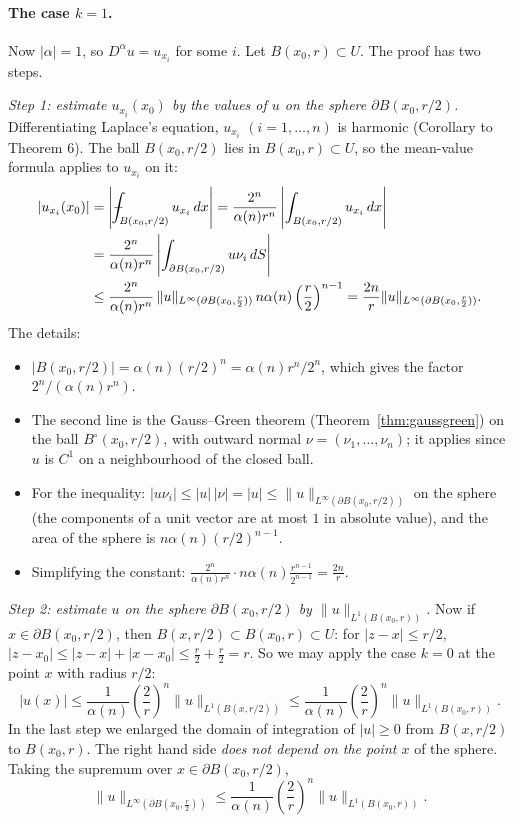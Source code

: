 \documentclass[11pt]{article}
\def\Xint#1{\mathchoice
  {\XXint\displaystyle\textstyle{#1}}%
  {\XXint\textstyle\scriptstyle{#1}}%
  {\XXint\scriptstyle\scriptscriptstyle{#1}}%
  {\XXint\scriptscriptstyle\scriptscriptstyle{#1}}%
  \!\int}
\def\XXint#1#2#3{{\setbox0=\hbox{$#1{#2#3}{\int}$}
  \vcenter{\hbox{$#2#3$}}\kern-.5\wd0}}
\def\fint{\Xint-}
\theoremstyle{plain}
\theoremstyle{definition}
\theoremstyle{remark}
\begin{document}
\paragraph{The case $k = 1$.} Now $|\alpha| = 1$, so $D^\alpha u = u_{x_i}$ for some $i$. Let $B(x_0,r) \subset U$. The proof has two steps.

\emph{Step 1: estimate $u_{x_i}(x_0)$ by the values of $u$ on the sphere $\partial B(x_0, r/2)$.} Differentiating Laplace's equation, $u_{x_i}$ $(i = 1,\dots,n)$ is harmonic (Corollary to Theorem 6). The ball $B(x_0,r/2)$ lies in $B(x_0,r) \subset U$, so the mean-value formula applies to $u_{x_i}$ on it:
\begin{align}
|u_{x_i}(x_0)| &= \left| \fint_{B(x_0,r/2)} u_{x_i}\, dx \right| = \frac{2^n}{\alpha(n) r^n}\left| \int_{B(x_0,r/2)} u_{x_i}\, dx \right| \notag \\
&= \frac{2^n}{\alpha(n)r^n}\left| \int_{\partial B(x_0,r/2)} u\nu_i\, dS \right| \label{eq:k1} \\
&\leq \frac{2^n}{\alpha(n)r^n}\, \|u\|_{L^\infty(\partial B(x_0,\frac r2))}\, n\alpha(n)\left(\frac r2\right)^{n-1} = \frac{2n}{r}\|u\|_{L^\infty(\partial B(x_0,\frac r2))}. \notag
\end{align}
The details:
\begin{itemize}
    \item $|B(x_0,r/2)| = \alpha(n)(r/2)^n = \alpha(n)r^n/2^n$, which gives the factor $2^n/(\alpha(n)r^n)$.
    \item The second line is the Gauss--Green theorem (Theorem~\ref{thm:gaussgreen}) on the ball $B^\circ(x_0,r/2)$, with outward normal $\nu = (\nu_1,\dots,\nu_n)$; it applies since $u$ is $C^1$ on a neighbourhood of the closed ball.
    \item For the inequality: $|u\nu_i| \leq |u|\,|\nu| = |u| \leq \|u\|_{L^\infty(\partial B(x_0,r/2))}$ on the sphere (the components of a unit vector are at most $1$ in absolute value), and the area of the sphere is $n\alpha(n)(r/2)^{n-1}$.
    \item Simplifying the constant: $\frac{2^n}{\alpha(n)r^n}\cdot n\alpha(n)\frac{r^{n-1}}{2^{n-1}} = \frac{2n}{r}$.
\end{itemize}

\emph{Step 2: estimate $u$ on the sphere $\partial B(x_0,r/2)$ by $\|u\|_{L^1(B(x_0,r))}$.} Now if $x \in \partial B(x_0,r/2)$, then $B(x,r/2) \subset B(x_0,r) \subset U$: for $|z - x| \leq r/2$, $|z - x_0| \leq |z - x| + |x - x_0| \leq \frac r2 + \frac r2 = r$. So we may apply the case $k = 0$ at the point $x$ with radius $r/2$:
$$ |u(x)| \leq \frac{1}{\alpha(n)}\left(\frac{2}{r}\right)^n\|u\|_{L^1(B(x,r/2))} \leq \frac{1}{\alpha(n)}\left(\frac{2}{r}\right)^n\|u\|_{L^1(B(x_0,r))}. $$
In the last step we enlarged the domain of integration of $|u| \geq 0$ from $B(x,r/2)$ to $B(x_0,r)$. The right hand side \emph{does not depend on the point $x$} of the sphere. Taking the supremum over $x \in \partial B(x_0, r/2)$,
$$ \|u\|_{L^\infty(\partial B(x_0,\frac r2))} \leq \frac{1}{\alpha(n)}\left(\frac2r\right)^n\|u\|_{L^1(B(x_0,r))}. $$
\end{document}

